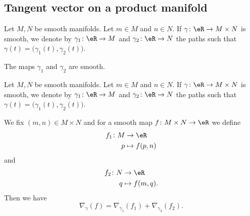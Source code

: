 \subsection{Tangent vector on a product manifold}

\begin{lemma}	\label{LEMooYUUCooDsSyuO}
	Let \( M,N\) be smooth manifolds. Let \( m\in M\) and \( n\in N\). If \(\gamma \colon \eR\to M\times N  \) is smooth, we denote by \(\gamma_1 \colon \eR\to M  \) and \(\gamma_2 \colon \eR\to N  \) the paths such that \( \gamma(t)=\big( \gamma_1(t),\gamma_2(t) \big)\).

	The maps \( \gamma_1\) and \( \gamma_2\) are smooth.
\end{lemma}

\begin{proposition}	\label{PROPooAKWIooGxTwnQ}
	Let \( M,N\) be smooth manifolds. Let \( m\in M\) and \( n\in N\). If \(\gamma \colon \eR\to M\times N  \) is smooth, we denote by \(\gamma_1 \colon \eR\to M  \) and \(\gamma_2 \colon \eR\to N  \) the paths such that \( \gamma(t)=\big( \gamma_1(t),\gamma_2(t) \big)\).

	We fix \( (m,n)\in M\times N\) and for a smooth map \(f \colon M\times N\to \eR  \) we define
	\begin{equation}
		\begin{aligned}
			f_1\colon M & \to \eR        \\
			p           & \mapsto f(p,n)
		\end{aligned}
	\end{equation}
	and \begin{equation}
		\begin{aligned}
			f_2\colon N & \to \eR         \\
			q           & \mapsto f(m,q).
		\end{aligned}
	\end{equation}
	Then we have
	\begin{equation}
		\nabla_{\gamma}(f)=\nabla_{\gamma_1}(f_1)+\nabla_{\gamma_2}(f_2).
	\end{equation}
\end{proposition}

